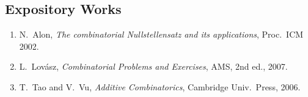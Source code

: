 \subsection*{Expository Works}
\begin{enumerate}
    \item N.\ Alon, \textit{The combinatorial Nullstellensatz and its applications}, Proc.\ ICM 2002.
    \item L.\ Lov\'asz, \textit{Combinatorial Problems and Exercises}, AMS, 2nd ed., 2007.
    \item T.\ Tao and V.\ Vu, \textit{Additive Combinatorics}, Cambridge Univ.\ Press, 2006.
\end{enumerate}

